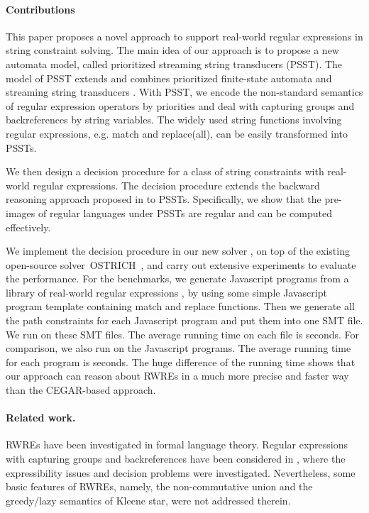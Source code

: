 \paragraph*{Contributions}
This paper proposes a novel approach to support real-world regular expressions in string constraint solving. The main idea of our approach is to propose a new automata model, called prioritized streaming string transducers (PSST). The model of PSST extends and combines prioritized finite-state automata \cite{BM17} and streaming string transducers \cite{AC10,AD11}. With PSST, we encode the non-standard semantics of regular expression operators by priorities and deal with capturing groups and backreferences by string variables. 
The widely used string functions involving regular expressions, e.g. match and replace(all), can be easily transformed into PSSTs. 

We then design a decision procedure for a class of string constraints with real-world regular expressions. The decision procedure extends the backward reasoning approach proposed in \cite{CHL+19} to PSSTs. Specifically, we show that the pre-images of regular languages under PSSTs are regular and can be computed effectively. 

We implement the decision procedure in our new solver \ostrich,
on top of the existing open-source solver~OSTRICH~\cite{CHL+19},
 and carry out extensive experiments to evaluate the performance. For the benchmarks, we generate  Javascript programs from a library of real-world regular expressions \cite{DMC+19}, by using some simple Javascript program template containing match and replace functions.  Then we generate all the path constraints for each Javascript program and put them into one SMT file. We run {\ostrich} on these SMT files. The average running time on each file is  seconds. For comparison, we also run \expose{} on the Javascript programs. The average running time for each program is  seconds. The huge difference of the running time shows that our approach can reason about RWREs in a much more precise and faster way than the CEGAR-based approach.


\paragraph*{Related work.}

RWREs have been investigated in formal language theory. Regular expressions with capturing groups and backreferences have been considered in \cite{CSY03,CN09,Freydenberger13,Schmid16,FS19}, where the expressibility issues and decision problems were investigated. Nevertheless, some basic features of RWREs, namely, the non-commutative union and the greedy/lazy semantics of Kleene star, were not addressed therein.

